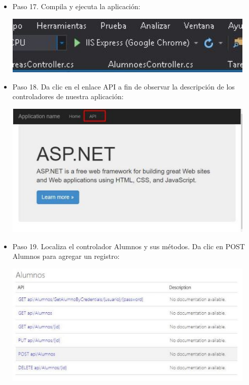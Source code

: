 \begin{flushleft}
\begin{itemize}
\item Paso 17. Compila y ejecuta la aplicación: 

\begin{center}
	\includegraphics[width=12cm]{./Imagenes/paso17} 
	\end{center}

\item Paso 18. Da clic en el enlace API a fin de observar la descripción de los controladores de nuestra aplicación: 
\begin{center}
	\includegraphics[width=12cm]{./Imagenes/paso18} 
	\end{center}

\item Paso 19. Localiza el controlador Alumnos y sus métodos. Da clic en POST Alumnos para agregar un
registro:
\begin{center}
	\includegraphics[width=12cm]{./Imagenes/paso19} 
	\end{center}


\end{itemize}
\end{flushleft}
